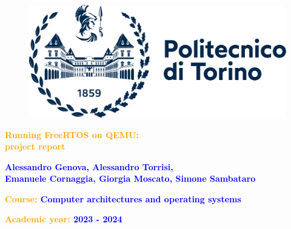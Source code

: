 \begin{titlepage}
    \begin{center}
        \begin{figure}
            \centering
            \includegraphics[scale=0.4]{Images/polito.png}
        \end{figure}
        \vspace*{3cm}

        {
            \fontsize{36}{15}\selectfont
            \textbf{\textcolor{orange}{Running FreeRTOS on QEMU: \\ project report}}
        }
    \end{center}

    \begin{center}
        \vspace*{0.2cm}

        {
            \fontsize{18}{10}\selectfont
            \textbf{\textcolor{blue}{Alessandro Genova, Alessandro Torrisi,\\ Emanuele Cornaggia, Giorgia Moscato, Simone Sambataro}}
        }

        \vspace*{0.4cm}
    \end{center}

    \vspace*{\fill}
    \begin{FlushLeft}

    \fontsize{18}{10}\selectfont
        {
            \textbf{\textcolor{orange}{Course:}
            \textcolor{blue}{Computer architectures and operating systems}}
        }

        \vspace*{0.4cm}
        {
           \textbf{\textcolor{orange}{Academic year:}
            \textcolor{blue}{2023 - 2024}}
        }

        \vspace{0.3cm}
    \end{FlushLeft}
\end{titlepage}
